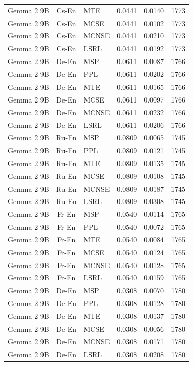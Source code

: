 \begin{table}
\begin{tabular}{lc}
Gemma 2 9B & Cs-En & MTE & 0.0441 & 0.0140 & 1773 \\
Gemma 2 9B & Cs-En & MCSE & 0.0441 & 0.0102 & 1773 \\
Gemma 2 9B & Cs-En & MCNSE & 0.0441 & 0.0210 & 1773 \\
Gemma 2 9B & Cs-En & LSRL & 0.0441 & 0.0192 & 1773 \\
Gemma 2 9B & De-En & MSP & 0.0611 & 0.0087 & 1766 \\
Gemma 2 9B & De-En & PPL & 0.0611 & 0.0202 & 1766 \\
Gemma 2 9B & De-En & MTE & 0.0611 & 0.0165 & 1766 \\
Gemma 2 9B & De-En & MCSE & 0.0611 & 0.0097 & 1766 \\
Gemma 2 9B & De-En & MCNSE & 0.0611 & 0.0232 & 1766 \\
Gemma 2 9B & De-En & LSRL & 0.0611 & 0.0206 & 1766 \\
Gemma 2 9B & Ru-En & MSP & 0.0809 & 0.0065 & 1745 \\
Gemma 2 9B & Ru-En & PPL & 0.0809 & 0.0121 & 1745 \\
Gemma 2 9B & Ru-En & MTE & 0.0809 & 0.0135 & 1745 \\
Gemma 2 9B & Ru-En & MCSE & 0.0809 & 0.0108 & 1745 \\
Gemma 2 9B & Ru-En & MCNSE & 0.0809 & 0.0187 & 1745 \\
Gemma 2 9B & Ru-En & LSRL & 0.0809 & 0.0308 & 1745 \\
Gemma 2 9B & Fr-En & MSP & 0.0540 & 0.0114 & 1765 \\
Gemma 2 9B & Fr-En & PPL & 0.0540 & 0.0072 & 1765 \\
Gemma 2 9B & Fr-En & MTE & 0.0540 & 0.0084 & 1765 \\
Gemma 2 9B & Fr-En & MCSE & 0.0540 & 0.0124 & 1765 \\
Gemma 2 9B & Fr-En & MCNSE & 0.0540 & 0.0128 & 1765 \\
Gemma 2 9B & Fr-En & LSRL & 0.0540 & 0.0159 & 1765 \\
Gemma 2 9B & De-En & MSP & 0.0308 & 0.0070 & 1780 \\
Gemma 2 9B & De-En & PPL & 0.0308 & 0.0128 & 1780 \\
Gemma 2 9B & De-En & MTE & 0.0308 & 0.0137 & 1780 \\
Gemma 2 9B & De-En & MCSE & 0.0308 & 0.0056 & 1780 \\
Gemma 2 9B & De-En & MCNSE & 0.0308 & 0.0171 & 1780 \\
Gemma 2 9B & De-En & LSRL & 0.0308 & 0.0208 & 1780 \\

\end{tabular}
\end{table}
